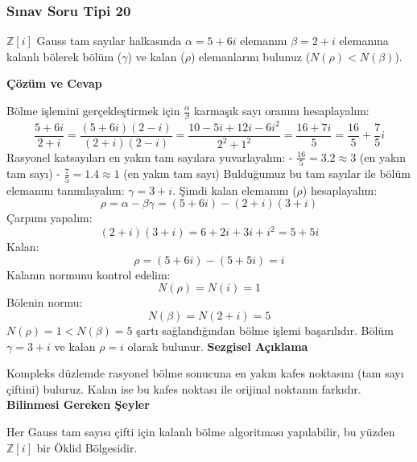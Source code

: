 \documentclass[11pt, a4paper]{article}
\newenvironment{cozum}{
    \vspace{0.5cm}
    \noindent\textcolor{green!60!black}{\faCheckCircle\enspace \textbf{\Large Çözüm ve Cevap}}\par\vspace{0.2cm}
}{}
\newenvironment{sezgisel}{
    \vspace{0.5cm}
    \noindent\textcolor{orange!80!black}{\faLightbulb\enspace \textbf{\Large Sezgisel Açıklama}}\par\vspace{0.2cm}
    \itshape
}{}
\newenvironment{bilgi}{
    \vspace{0.5cm}
    \noindent\textcolor{red!70!black}{\faExclamationTriangle\enspace \textbf{\Large Bilinmesi Gereken Şeyler}}\par\vspace{0.2cm}
}{}
\begin{document}
\subsubsection{Sınav Soru Tipi 20}
\begin{sinavbox}
$\mathbb{Z}[i]$ Gauss tam sayılar halkasında $\alpha = 5+6i$ elemanını $\beta = 2+i$ elemanına kalanlı bölerek bölüm ($\gamma$) ve kalan ($\rho$) elemanlarını bulunuz ($N(\rho) < N(\beta)$).
\end{sinavbox}
\begin{cozum}
Bölme işlemini gerçekleştirmek için $\frac{\alpha}{\beta}$ karmaşık sayı oranını hesaplayalım:
\[ \frac{5+6i}{2+i} = \frac{(5+6i)(2-i)}{(2+i)(2-i)} = \frac{10 - 5i + 12i - 6i^2}{2^2+1^2} = \frac{16+7i}{5} = \frac{16}{5} + \frac{7}{5}i \]
Rasyonel katsayıları en yakın tam sayılara yuvarlayalım:
- $\frac{16}{5} = 3.2 \approx 3$ (en yakın tam sayı)
- $\frac{7}{5} = 1.4 \approx 1$ (en yakın tam sayı)
Bulduğumuz bu tam sayılar ile bölüm elemanını tanımlayalım: $\gamma = 3+i$.
Şimdi kalan elemanını ($\rho$) hesaplayalım:
\[ \rho = \alpha - \beta \gamma = (5+6i) - (2+i)(3+i) \]
Çarpımı yapalım:
\[ (2+i)(3+i) = 6 + 2i + 3i + i^2 = 5 + 5i \]
Kalan:
\[ \rho = (5+6i) - (5+5i) = i \]
Kalanın normunu kontrol edelim:
\[ N(\rho) = N(i) = 1 \]
Bölenin normu:
\[ N(\beta) = N(2+i) = 5 \]
$N(\rho) = 1 < N(\beta) = 5$ şartı sağlandığından bölme işlemi başarılıdır.
Bölüm $\gamma = 3+i$ ve kalan $\rho = i$ olarak bulunur.
\end{cozum}
\begin{sezgisel}
Kompleks düzlemde rasyonel bölme sonucuna en yakın kafes noktasını (tam sayı çiftini) buluruz. Kalan ise bu kafes noktası ile orijinal noktanın farkıdır.
\end{sezgisel}
\begin{bilgi}
Her Gauss tam sayısı çifti için kalanlı bölme algoritması yapılabilir, bu yüzden $\mathbb{Z}[i]$ bir Öklid Bölgesidir.
\end{bilgi}

\newpage
\end{document}
